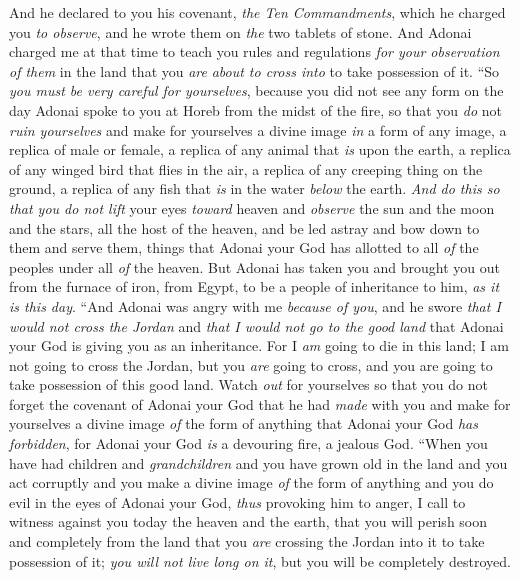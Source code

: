 \begin{biblechapter}
\verse And he declared to you his covenant, \textit{the Ten Commandments}, which he charged you \textit{to observe}, and he wrote them on \textit{the} two tablets of stone.
\verse And Adonai charged me at that time to teach you rules and regulations \textit{for your observation of them} in the land that you \textit{are} \textit{about to cross into} to take possession of it.
\verse “So \textit{you must be very careful for yourselves}, because you did not see any form on the day Adonai spoke to you at Horeb from the midst of the fire,
\verse so that you \textit{do} not \textit{ruin yourselves} and make for yourselves a divine image \textit{in} a form of any image, a replica of male or female,
\verse a replica of any animal that \textit{is} upon the earth, a replica of any winged bird that flies in the air,
\verse a replica of any creeping thing on the ground, a replica of any fish that \textit{is} in the water \textit{below} the earth.
\verse \textit{And do this so that you do not lift} your eyes \textit{toward} heaven and \textit{observe} the sun and the moon and the stars, all the host of the heaven, and be led astray and bow down to them and serve them, things that Adonai your God has allotted to all \textit{of} the peoples under all \textit{of} the heaven.
\verse But Adonai has taken you and brought you out from the furnace of iron, from Egypt, to be a people of inheritance to him, \textit{as it is this day}.
\verse “And Adonai was angry with me \textit{because of you}, and he swore \textit{that I would not cross the Jordan} and \textit{that I would not go to the good land} that Adonai your God is giving you as an inheritance.
\verse For I \textit{am} going to die in this land; I am not going to cross the Jordan, but you \textit{are} going to cross, and you are going to take possession of this good land.
\verse Watch \textit{out} for yourselves so that you do not forget the covenant of Adonai your God that he had \textit{made} with you and make for yourselves a divine image \textit{of} the form of anything that Adonai your God \textit{has forbidden},
\verse for Adonai your God \textit{is} a devouring fire, a jealous God.
\verse “When you have had children and \textit{grandchildren} and you have grown old in the land and you act corruptly and you make a divine image \textit{of} the form of anything and you do evil in the eyes of Adonai your God, \textit{thus} provoking him to anger,
\verse I call to witness against you today the heaven and the earth, that you will perish soon and completely from the land that you \textit{are} crossing the Jordan into it to take possession of it; \textit{you will not live long on it}, but you will be completely destroyed.

\end{biblechapter}
